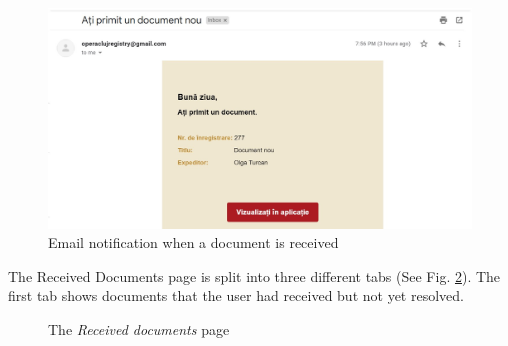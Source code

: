 \begin{figure}[H]
    \centering
    \includegraphics[width=5.5in]{images/app/document_received_mail}
    \caption{Email notification when a document is received}
    \label{receivedEmail}
\end{figure}

The Received Documents page is split into three different tabs (See Fig. \ref{receivedDocs}). The first tab shows documents that the user had received but not yet resolved.

\begin{figure}[ht]
    \centering
    \qquad
    \caption{The \textit{Received documents} page}
    \label{receivedDocs}
\end{figure}

